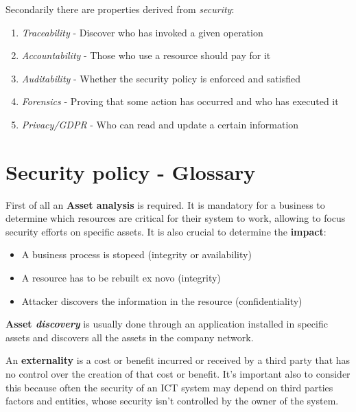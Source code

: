 Secondarily there are properties derived from \textit{security}:
\begin{enumerate}
    \item \textit{Traceability} - Discover who has invoked a given operation
    \item \textit{Accountability} - Those who use a resource should pay for it
    \item \textit{Auditability} - Whether the security policy is enforced and satisfied
    \item \textit{Forensics} - Proving that some action has occurred and who has executed it
    \item \textit{Privacy/GDPR} - Who can read and update a certain information
\end{enumerate}



\section{Security policy - Glossary}
First of all an \textbf{Asset analysis} is required.
It is mandatory for a business to determine which resources are critical for their system to work,
allowing to focus security efforts on specific assets.\nl
It is also crucial to determine the \textbf{impact}:
\begin{itemize}
    \item A business process is stopeed (integrity or availability)
    \item A resource has to be rebuilt ex novo (integrity)
    \item Attacker discovers the information in the resource (confidentiality)
\end{itemize}

\textbf{Asset \textit{discovery}} is usually done through an application installed in specific assets and discovers all the assets in the company network.\nl

An \textbf{externality} is a cost or benefit incurred or received by a third party that has no control over the creation of that cost or benefit.
It's important also to consider this because often the security of an ICT system may depend on third parties factors and entities,
whose security isn't controlled by the owner of the system.\nl

